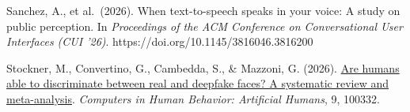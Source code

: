 \documentclass[11pt]{article}
\begin{document}
Sanchez, A., et al.~(2026). When text-to-speech speaks in your voice: A
study on public perception. In \emph{Proceedings of the ACM Conference
on Conversational User Interfaces (CUI '26)}.
https://doi.org/10.1145/3816046.3816200

Stockner, M., Convertino, G., Cambedda, S., \& Mazzoni, G. (2026).
\href{https://www.sciencedirect.com/science/article/pii/S2949882126000848}{Are
humans able to discriminate between real and deepfake faces? A
systematic review and meta-analysis}. \emph{Computers in Human Behavior:
Artificial Humans}, 9, 100332.
\endgroup
\end{document}
